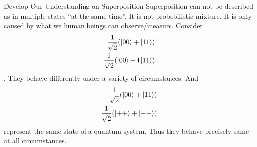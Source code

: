 \documentclass{beamer}
\begin{document}
\begin{frame}{Develop Our Understanding on Superposition}
  {\tiny
  Superposition can not be described as in multiple states “at the same time”. It is not probabilistic mixture. It is only caused by what we human beings can observe/measure.
  Consider
  \begin{align*}
    \frac{1}{\sqrt{2}} (\ket{00} + \ket{11}) \\
    \frac{1}{\sqrt{2}} (\ket{00} + \textbf{i}\ket{11})
  \end{align*}.
  They behave differently under a variety of circumstances. And 
  \begin{align*}
    \frac{1}{\sqrt{2}} (\ket{00} + \ket{11}) \\
    \frac{1}{\sqrt{2}} (\ket{++} + \ket{--})
  \end{align*}
  represent the same state of a quantum system. Thus they behave precisely same at all circumstances.
  }%
\end{frame}
\end{document}
